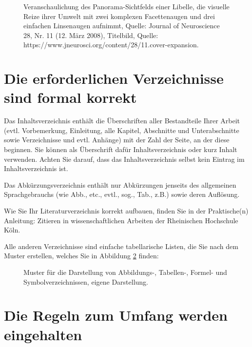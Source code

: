 \begin{figure}[h]
\centering
\caption[Veranschaulichung des Panorama-Sichtfelds einer Libelle, die visuelle Reize ihrer Umwelt mit zwei komplexen Facettenaugen und drei einfachen Linsenaugen aufnimmt]{Veranschaulichung des Panorama-Sichtfelds einer Libelle, die visuelle Reize ihrer Umwelt mit zwei komplexen Facettenaugen und drei einfachen Linsenaugen aufnimmt, Quelle: Journal of Neuroscience 28, Nr. 11 (12. März 2008), Titelbild, Quelle: https://www.jneurosci.org/content/28/11.cover-expansion.}
\label{fig:libelle}
\end{figure}

\section{Die erforderlichen Verzeichnisse sind formal korrekt}
\label{sec:verzeichnisse}

Das Inhaltsverzeichnis enthält die Überschriften aller Bestandteile Ihrer Arbeit (evtl. Vorbemerkung, Einleitung, alle Kapitel, Abschnitte und Unterabschnitte sowie Verzeichnisse und evtl. Anhänge) mit der Zahl der Seite, an der diese beginnen. Sie können als Überschrift dafür Inhaltsverzeichnis oder kurz Inhalt verwenden. Achten Sie darauf, dass das Inhaltsverzeichnis selbst kein Eintrag im Inhaltsverzeichnis ist.

Das Abkürzungsverzeichnis enthält nur Abkürzungen jenseits des allgemeinen Sprachgebrauchs (wie Abb., etc., evtl., sog., Tab., z.B.) sowie deren Auflösung.

Wie Sie Ihr Literaturverzeichnis korrekt aufbauen, finden Sie in der Praktische(n) Anleitung: Zitieren in wissenschaftlichen Arbeiten der Rheinischen Hochschule Köln.

Alle anderen Verzeichnisse sind einfache tabellarische Listen, die Sie nach dem Muster erstellen, welches Sie in Abbildung \ref{fig:verzeichnisse} finden:

\begin{figure}[h]
\centering
\caption[Muster für die Darstellung von Abbildungs-, Tabellen-, Formel- und Symbolverzeichnissen]{Muster für die Darstellung von Abbildungs-, Tabellen-, Formel- und Symbolverzeichnissen, eigene Darstellung.}
\label{fig:verzeichnisse}
\end{figure}

\section{Die Regeln zum Umfang werden eingehalten}
\label{sec:umfang}

